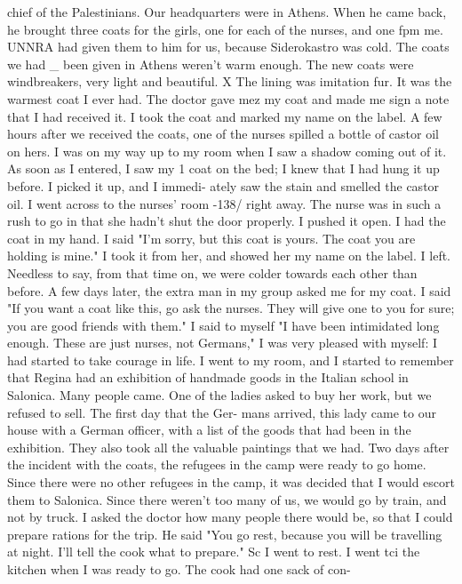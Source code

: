 chief of the Palestinians. Our headquarters were in Athens. When he came back, he 
brought three coats for the girls, one for each of the nurses, and one fpm me. 
UNNRA had given them to him for us, because Siderokastro was cold. The coats we had _ 
been given in Athens weren't warm enough. The new coats were windbreakers, very 
light and beautiful. X The lining was imitation fur. It was the warmest coat I 
ever had. 
The doctor gave mez my coat and made me sign a note that I had received it. I 
took the coat and marked my name on the label. A few hours after we received the 
coats, one of the nurses spilled a bottle of castor oil on hers. I was on my way 
up to my room when I saw a shadow coming out of it. As soon as I entered, I saw my 1 
coat on the bed; I knew that I had hung it up before. I picked it up, and I immedi-
ately saw the stain and smelled the castor oil. I went across to the nurses' room 
-138/ 
right away. The nurse was in such a rush to go in that she hadn't shut the door 
properly. I pushed it open. I had the coat in my hand. I said "I'm sorry, but 
this coat is yours. The coat you are holding is mine." I took it from her, and 
showed her my name on the label. I left. Needless to say, from that time on, we 
were colder towards each other than before. 
A few days later, the extra man in my group asked me for my coat. I said "If 
you want a coat like this, go ask the nurses. They will give one to you for sure; 
you are good friends with them." I said to myself "I have been intimidated long 
enough. These are just nurses, not Germans," I was very pleased with myself: I 
had started to take courage in life. 
I went to my room, and I started to remember that Regina had an exhibition of 
handmade goods in the Italian school in Salonica. Many people came. One of the 
ladies asked to buy her work, but we refused to sell. The first day that the Ger-
mans arrived, this lady came to our house with a German officer, with a list of the 
goods that had been in the exhibition. They also took all the valuable paintings 
that we had. 
Two days after the incident with the coats, the refugees in the camp were ready 
to go home. Since there were no other refugees in the camp, it was decided that I 
would escort them to Salonica. Since there weren't too many of us, we would go by 
train, and not by truck. I asked the doctor how many people there would be, so that 
I could prepare rations for the trip. He said "You go rest, because you will be 
travelling at night. I'll tell the cook what to prepare." Sc I went to rest. 
I went tci the kitchen when I was ready to go. The cook had one sack of con-
